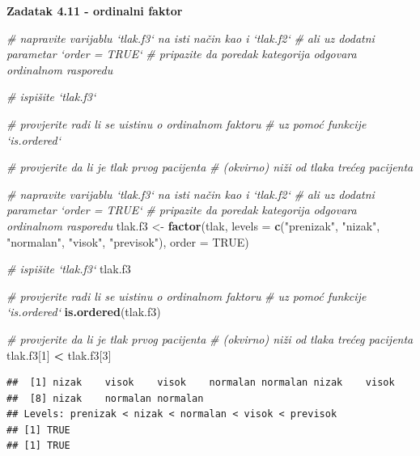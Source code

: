 \documentclass[]{book}
\newenvironment{Shaded}{\begin{snugshade}}{\end{snugshade}}
\newcommand{\KeywordTok}[1]{\textcolor[rgb]{0.13,0.29,0.53}{\textbf{#1}}}
\newcommand{\DataTypeTok}[1]{\textcolor[rgb]{0.13,0.29,0.53}{#1}}
\newcommand{\DecValTok}[1]{\textcolor[rgb]{0.00,0.00,0.81}{#1}}
\newcommand{\StringTok}[1]{\textcolor[rgb]{0.31,0.60,0.02}{#1}}
\newcommand{\CommentTok}[1]{\textcolor[rgb]{0.56,0.35,0.01}{\textit{#1}}}
\newcommand{\OtherTok}[1]{\textcolor[rgb]{0.56,0.35,0.01}{#1}}
\newcommand{\OperatorTok}[1]{\textcolor[rgb]{0.81,0.36,0.00}{\textbf{#1}}}
\newcommand{\NormalTok}[1]{#1}
\theoremstyle{definition}
\theoremstyle{definition}
\theoremstyle{definition}
\theoremstyle{remark}
\begin{document}
\textbf{Zadatak 4.11 - ordinalni faktor}

\begin{Shaded}
\begin{Highlighting}[]
\CommentTok{# napravite varijablu `tlak.f3` na isti način kao i `tlak.f2`}
\CommentTok{# ali uz dodatni parametar `order = TRUE`}
\CommentTok{# pripazite da poredak kategorija odgovara ordinalnom rasporedu}


\CommentTok{# ispišite `tlak.f3`}


\CommentTok{# provjerite radi li se uistinu o ordinalnom faktoru }
\CommentTok{# uz pomoć funkcije `is.ordered`}


\CommentTok{# provjerite da li je tlak prvog pacijenta}
\CommentTok{# (okvirno) niži od tlaka trećeg pacijenta}
\end{Highlighting}
\end{Shaded}

\begin{Shaded}
\begin{Highlighting}[]
\CommentTok{# napravite varijablu `tlak.f3` na isti način kao i `tlak.f2`}
\CommentTok{# ali uz dodatni parametar `order = TRUE`}
\CommentTok{# pripazite da poredak kategorija odgovara ordinalnom rasporedu}
\NormalTok{tlak.f3 <-}\StringTok{ }\KeywordTok{factor}\NormalTok{(tlak, }\DataTypeTok{levels =} \KeywordTok{c}\NormalTok{(}\StringTok{"prenizak"}\NormalTok{, }\StringTok{"nizak"}\NormalTok{, }\StringTok{"normalan"}\NormalTok{, }\StringTok{"visok"}\NormalTok{, }\StringTok{"previsok"}\NormalTok{), }\DataTypeTok{order =} \OtherTok{TRUE}\NormalTok{)}

\CommentTok{# ispišite `tlak.f3`}
\NormalTok{tlak.f3}

\CommentTok{# provjerite radi li se uistinu o ordinalnom faktoru }
\CommentTok{# uz pomoć funkcije `is.ordered`}
\KeywordTok{is.ordered}\NormalTok{(tlak.f3)}


\CommentTok{# provjerite da li je tlak prvog pacijenta}
\CommentTok{# (okvirno) niži od tlaka trećeg pacijenta}
\NormalTok{tlak.f3[}\DecValTok{1}\NormalTok{] }\OperatorTok{<}\StringTok{ }\NormalTok{tlak.f3[}\DecValTok{3}\NormalTok{]}
\end{Highlighting}
\end{Shaded}

\begin{verbatim}
##  [1] nizak    visok    visok    normalan normalan nizak    visok   
##  [8] nizak    normalan normalan
## Levels: prenizak < nizak < normalan < visok < previsok
## [1] TRUE
## [1] TRUE
\end{verbatim}
\end{document}
